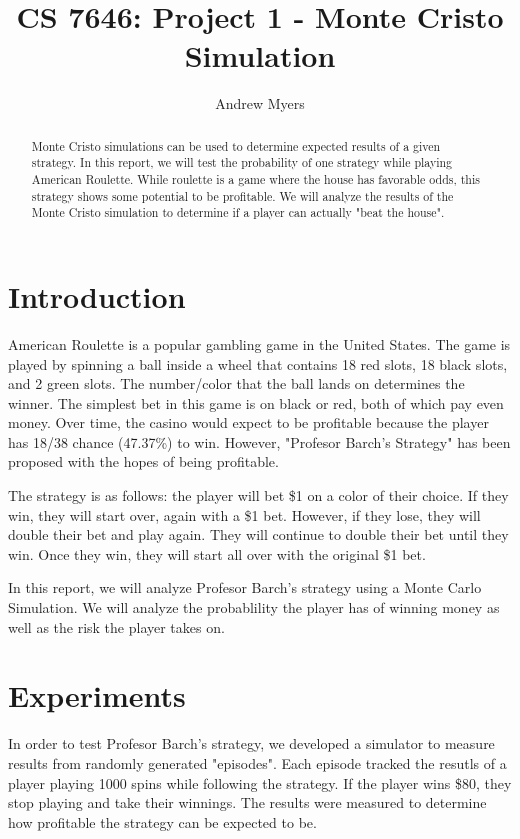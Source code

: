 \documentclass[
	letterpaper, %
]{jdf}
\author{Andrew Myers}
\title{CS 7646: Project 1 - Monte Cristo Simulation}
\begin{document}

\maketitle

\begin{abstract}
Monte Cristo simulations can be used to determine expected results of a given strategy.
In this report, we will test the probability of one strategy while playing American Roulette.
While roulette is a game where the house has favorable odds, this strategy shows some potential to be profitable.
We will analyze the results of the Monte Cristo simulation to determine if a player can actually "beat the house".
\end{abstract}

\section{Introduction}
American Roulette is a popular gambling game in the United States. The game is played by spinning a ball inside a wheel that contains 18
red slots, 18 black slots, and 2 green slots. The number/color that the ball lands on determines the winner. The simplest bet in this game is 
on black or red, both of which pay even money. 
Over time, the casino would expect to be profitable because the player has 18/38 chance (47.37\%) to win. 
However, "Profesor Barch's Strategy" has been proposed with the hopes of being profitable.

The strategy is as follows: the player will bet \$1 on a color of their choice. If they win, they will start over, again with a \$1 bet. 
However, if they lose, they will double their bet and play again. They will continue to double their bet until they win. Once they win,
they will start all over with the original \$1 bet.

In this report, we will analyze Profesor Barch's strategy using a Monte Carlo Simulation. We will analyze the probablility the player has of winning
money as well as the risk the player takes on.

\section{Experiments}
In order to test Profesor Barch's strategy, we developed a simulator to measure results from randomly generated "episodes".
Each episode tracked the resutls of a player playing 1000 spins while following the strategy.
If the player wins \$80, they stop playing and take their winnings.
The results were measured to determine how profitable the strategy can be expected to be.
\end{document}
